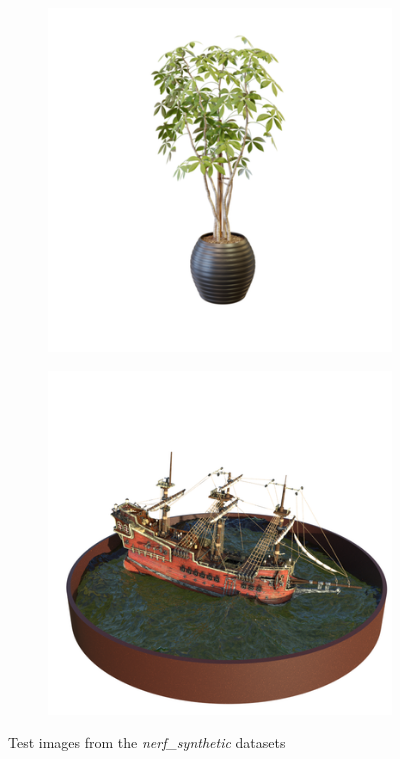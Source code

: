 \documentclass{article}
\begin{document}
\begin{figure}[!h]
\begin{subfigure}{.24\textwidth}
\end{subfigure}
\begin{subfigure}{.24\textwidth}
  \centering
  \includegraphics[width=\linewidth]{figs/results/ficus_ref.png}  
\end{subfigure}
\begin{subfigure}{.24\textwidth}
  \centering
  \includegraphics[width=\linewidth]{figs/results/ship_ref.png}  
\end{subfigure}

     \caption{Test images from the \textit{nerf\_synthetic} datasets}
    \label{fig:dataset}
\end{figure}
\end{document}
